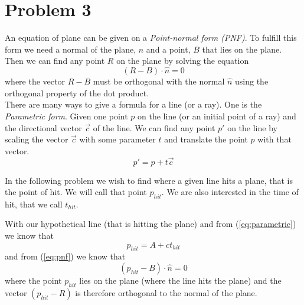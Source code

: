 \section*{Problem 3}
An equation of plane can be given on a \emph{Point-normal form (PNF)}. To fulfill this form
we need a normal of the plane, $\hat{n}$ and a point, $B$ that lies on the plane.
Then we can find any point $R$ on the plane by solving the equation
\begin{equation}
    \left( R - B \right) \cdot \hat{n} = 0
    \label{eq:pnf}
\end{equation}
where the vector $R-B$ must be orthogonal with the normal $\hat{n}$ using the orthogonal property of the
dot product.\\

There are many ways to give a formula for a line (or a ray). One is the \emph{Parametric form}.
Given one point $p$ on the line (or an initial point of a ray) and the directional vector $\vec{c}$ of the line.
We can find any point $p'$ on the line by scaling the vector $\vec{c}$ with some parameter $t$ and translate
the point $p$ with that vector.
\begin{equation}
    p' = p + t\vec{c}
    \label{eq:parametric}
\end{equation}

In the following problem we wish to find where a given line hits a plane, that is the point of hit.
We will call that point $p_{hit}$. We are also interested in the time of hit, that we call $t_{hit}$.

With our hypothetical line (that is hitting the plane) and from (\ref{eq:parametric}) we know that
\begin{equation}
    p_{hit} = A + ct_{hit}
    \label{ref:phit}
\end{equation}
and from (\ref{eq:pnf}) we know that
\begin{equation}
    \left( p_{hit} - B \right) \cdot \hat{n} = 0
    \label{ref:step2}
\end{equation}
where the point $p_{hit}$ lies on the plane (where the line hits the plane) and the vector $\left( p_{hit}-R \right)$ is therefore orthogonal to the normal of the plane.

